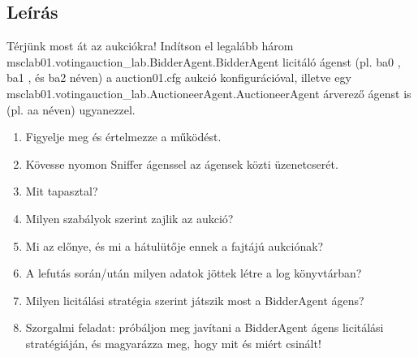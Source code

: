 \subsection{Leírás}
Térjünk  most  át  az  aukciókra!  Indítson  el  legalább  három
msclab01.votingauction_lab.BidderAgent.BidderAgent licitáló ágenst (pl.  ba0 ,
ba1 , és  ba2 néven) a  auction01.cfg aukció
konfigurációval,  illetve  egy
msclab01.votingauction\_lab.AuctioneerAgent.AuctioneerAgent árverező
ágenst is (pl.  aa néven) ugyanezzel.
\begin{enumerate}
	\item Figyelje meg és értelmezze a működést.
	\item Kövesse nyomon Sniffer ágenssel az ágensek közti üzenetcserét.
	\item Mit tapasztal?
	\item Milyen szabályok szerint zajlik az aukció?
	\item Mi az előnye, és mi a hátulütője ennek a fajtájú aukciónak?
	\item A lefutás során/után milyen adatok jöttek létre a log
	könyvtárban?
	\item Milyen licitálási stratégia szerint játszik most a BidderAgent ágens?
	\item Szorgalmi feladat: próbáljon meg javítani a BidderAgent ágens licitálási stratégiáján, és
	magyarázza meg, hogy mit és miért csinált!
\end{enumerate}
